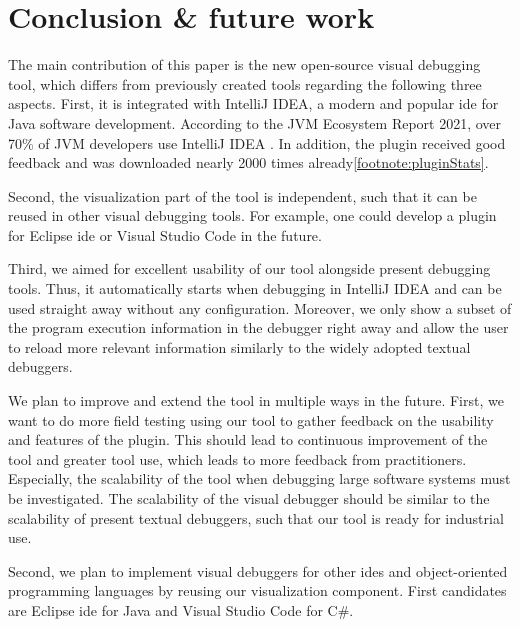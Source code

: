 \documentclass[conference]{IEEEtran}
\newcommand{\intellij}{IntelliJ IDEA}
\begin{document}
\section{Conclusion \& future work} \label{sec:conclusion}
The main contribution of this paper is the new open-source visual debugging tool, which differs from previously created tools regarding the following three aspects.
First, it is integrated with \intellij{}, a modern and popular \gls*{ide} for Java software development.
According to the JVM Ecosystem Report 2021, over 70\% of JVM developers use \intellij{}  \cite{JVMEcosystemReport2021}.
In addition, the plugin received good feedback and was downloaded nearly 2000 times already\cref{footnote:pluginStats}.

Second, the visualization part of the tool is independent, such that it can be reused in other visual debugging tools.
For example, one could develop a plugin for Eclipse \gls*{ide} or Visual Studio Code in the future.

Third, we aimed for excellent usability of our tool alongside present debugging tools.
Thus, it automatically starts when debugging in \intellij{} and can be used straight away without any configuration.
Moreover, we only show a subset of the program execution information in the debugger right away and allow the user to reload more relevant information similarly to the widely adopted textual debuggers.

We plan to improve and extend the tool in multiple ways in the future.
First, we want to do more field testing using our tool to gather feedback on the usability and features of the plugin.
This should lead to continuous improvement of the tool and greater tool use, which leads to more feedback from practitioners. 
Especially, the scalability of the tool when debugging large software systems must be investigated.
The scalability of the visual debugger should be similar to the scalability of present textual debuggers, such that our tool is ready for industrial use.

Second, we plan to implement visual debuggers for other \glspl*{ide} and object-oriented programming languages by reusing our visualization component.
First candidates are Eclipse \gls*{ide} for Java and Visual Studio Code for C\#.
\end{document}
